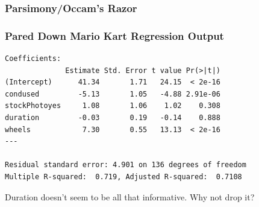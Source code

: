 \documentclass[handout]{beamer}
\newcommand{\blue}[1]{\textcolor{blue2}{#1}}
\begin{document}
\begin{frame}[fragile]
\frametitle{Parsimony/Occam's Razor}
%
%
%
%

\end{frame}


\begin{frame}[fragile]
\frametitle{Pared Down Mario Kart Regression Output}

\begin{small}
\begin{verbatim}
Coefficients:
              Estimate Std. Error t value Pr(>|t|)    
(Intercept)      41.34       1.71   24.15  < 2e-16
condused         -5.13       1.05   -4.88 2.91e-06
stockPhotoyes     1.08       1.06    1.02    0.308    
duration         -0.03       0.19   -0.14    0.888    
wheels            7.30       0.55   13.13  < 2e-16
---

Residual standard error: 4.901 on 136 degrees of freedom
Multiple R-squared:  0.719,	Adjusted R-squared:  0.7108 
\end{verbatim}
\end{small}

\pause Duration doesn't seem to be all that informative.  Why not drop it?

\end{frame}
\end{document}
